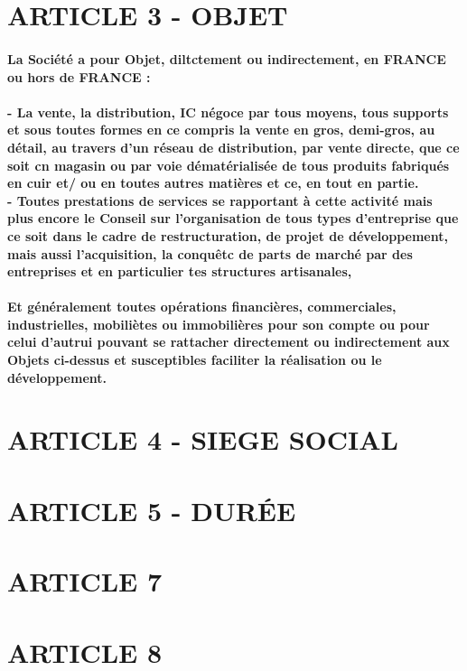 \documentclass[a4paper, 11pt]{article}
\begin{document}
\section*{ARTICLE 3 - OBJET}

\paragraph{
  La Société a pour Objet, diltctement ou indirectement, en FRANCE ou hors de FRANCE :
}

\paragraph{
  - La vente, la distribution, IC négoce par tous moyens, tous supports et sous toutes formes en ce compris la vente en gros, demi-gros, au détail, au travers d'un réseau de distribution, par vente directe, que ce soit cn magasin ou par voie dématérialisée de tous produits fabriqués en cuir et/ ou en toutes autres matières et ce, en tout en partie.\\
  - Toutes prestations de services se rapportant à cette activité mais plus encore le Conseil sur l'organisation de tous types d'entreprise que ce soit dans le cadre de restructuration, de projet de développement, mais aussi l'acquisition, la conquêtc de parts de marché par des entreprises et en particulier tes structures artisanales,
}

\paragraph{
  Et généralement toutes opérations financières, commerciales, industrielles, mobiliètes ou immobilières pour son compte ou pour celui d'autrui pouvant se rattacher directement ou indirectement aux Objets ci-dessus et susceptibles faciliter la réalisation ou le développement.
}
\section*{ARTICLE 4 - SIEGE SOCIAL}
\section*{ARTICLE 5 - DURÉE}
\section*{ARTICLE 7}
\section*{ARTICLE 8}
\end{document}
